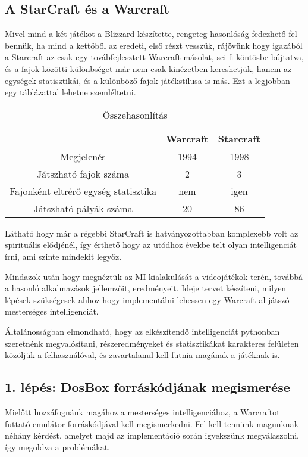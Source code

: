 \subsection{A StarCraft és a Warcraft}
Mivel mind a két játékot a Blizzard készítette, rengeteg hasonlóság fedezhető fel bennük, ha mind a kettőből az eredeti, első részt vesszük, rájövünk hogy igazából a Starcraft az csak egy továbfejlesztett Warcraft másolat, sci-fi köntösbe bújtatva, és a fajok közötti különbséget már nem csak kinézetben kereshetjük, hanem az egységek statisztikái, és a különböző fajok játékstílusa is más. Ezt a legjobban egy táblázattal lehetne szemléltetni.
\begin{table}[h]
    \centering
    \caption{Összehasonlítás}
    \label{tab:osszehasonlitas}
    \begin{tabular}{|c|c|c|}
    \hline
    ~ & Warcraft & Starcraft \\
    \hline
    Megjelenés & 1994 & 1998 \\
    Játszható fajok száma & 2 & 3 \\
    Fajonként eltrérő egység statisztika & nem & igen \\
    Játszható pályák száma & 20 & 86 \\
    \hline
    \end{tabular}
\end{table}

Látható hogy már a régebbi StarCraft is hatványozottabban komplexebb volt az spirituális elődjénél, így érthető hogy az utódhoz évekbe telt olyan intelligenciát írni, ami szinte mindekit legyőz.


Mindazok után hogy megnéztük az MI kialakulását a videojátékok terén, továbbá a hasonló alkalmazások jellemzőit, eredményeit. Ideje tervet készíteni, milyen lépések szükségesek ahhoz hogy implementálni lehessen egy Warcraft-al játszó mesterséges intelligenciát.

Általánosságban elmondható, hogy az elkészítendő intelligenciát pythonban szeretnénk megvalósítani, részeredményeket és statisztikákat karakteres felületen közöljük a felhasználóval, és zavartalanul kell futnia magának a játéknak is.

\subsection{1. lépés: DosBox forráskódjának megismerése}

Mielőtt hozzáfognánk magához a mesterséges intelligenciához, a Warcraftot futtató emulátor forráskódjával kell megismerkedni. Fel kell tennünk magunknak néhány kérdést, amelyet majd az implementáció során igyekszünk megválaszolni, így megoldva a problémákat.

